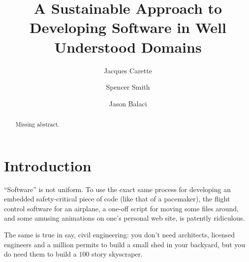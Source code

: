 \documentclass[sigconf,review]{acmart}
\begin{document}
\title{A Sustainable Approach to Developing Software in Well Understood Domains}

\author{Jacques Carette}

\author{Spencer Smith}

\author{Jason Balaci}

\begin{abstract}
  Missing abstract. %
\end{abstract}





\newtheorem{defn}{Definition}

\maketitle

\section{Introduction} \label{ch:introduction}

``Software'' is not uniform. To use the exact same process for
developing an embedded safety-critical piece of code (like that of
a pacemaker), the flight control software for an airplane, a one-off
script for moving some files around, and some amusing animations on
one's personal web site, is patently ridiculous.

The same is true in say, civil engineering: you don't need architects,
licensed engineers and a million permits to build a small shed in your
backyard, but you do need them to build a $100$ story skyscraper.
\end{document}
